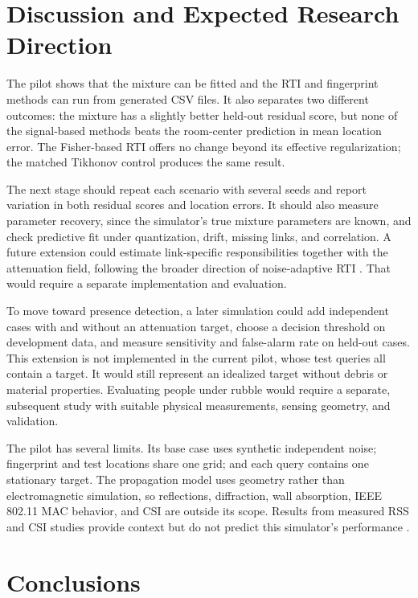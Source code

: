 \documentclass[sensors,article,submit,oneauthor]{Definitions/mdpi}
\begin{document}
\section{Discussion and Expected Research Direction}

The pilot shows that the mixture can be fitted and the RTI and fingerprint methods can run from generated CSV files. It also separates two different outcomes: the mixture has a slightly better held-out residual score, but none of the signal-based methods beats the room-center prediction in mean location error. The Fisher-based RTI offers no change beyond its effective regularization; the matched Tikhonov control produces the same result.

The next stage should repeat each scenario with several seeds and report variation in both residual scores and location errors. It should also measure parameter recovery, since the simulator's true mixture parameters are known, and check predictive fit under quantization, drift, missing links, and correlation. A future extension could estimate link-specific responsibilities together with the attenuation field, following the broader direction of noise-adaptive RTI \cite{Huang2020}. That would require a separate implementation and evaluation.

To move toward presence detection, a later simulation could add independent cases with and without an attenuation target, choose a decision threshold on development data, and measure sensitivity and false-alarm rate on held-out cases. This extension is not implemented in the current pilot, whose test queries all contain a target. It would still represent an idealized target without debris or material properties. Evaluating people under rubble would require a separate, subsequent study with suitable physical measurements, sensing geometry, and validation.

The pilot has several limits. Its base case uses synthetic independent noise; fingerprint and test locations share one grid; and each query contains one stationary target. The propagation model uses geometry rather than electromagnetic simulation, so reflections, diffraction, wall absorption, IEEE 802.11 MAC behavior, and CSI are outside its scope. Results from measured RSS and CSI studies provide context but do not predict this simulator's performance \cite{Wilson2010,Huang2020,Kaltiokallio2021}.

\section{Conclusions}
\end{document}
